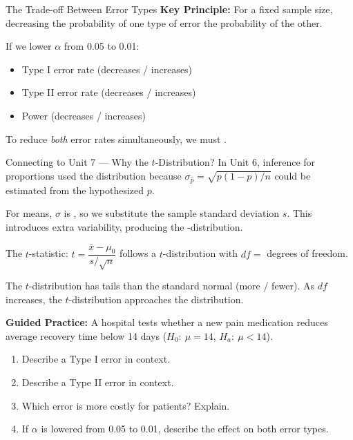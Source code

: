 \documentclass[10pt]{article}
\begin{document}
\begin{notesbox}{The Trade-off Between Error Types}
\textbf{Key Principle:} For a fixed sample size, decreasing the probability of one type
of error \blank{4cm} the probability of the other.

\vspace{0.1in}
If we lower $\alpha$ from 0.05 to 0.01:
\begin{itemize}
    \item Type I error rate \blank{2cm} (decreases / increases)
    \item Type II error rate \blank{2cm} (decreases / increases)
    \item Power \blank{2cm} (decreases / increases)
\end{itemize}

\vspace{0.1in}
To reduce \emph{both} error rates simultaneously, we must \blank{5cm}.
\end{notesbox}

\begin{notesbox}{Connecting to Unit 7 --- Why the $t$-Distribution?}
In Unit 6, inference for proportions used the \blank{2cm} distribution because
$\sigma_{\hat p} = \sqrt{p(1-p)/n}$ could be estimated from the hypothesized $p$.

For means, $\sigma$ is \blank{4cm}, so we substitute the sample standard deviation
$s$. This introduces extra variability, producing the \blank{3cm}-distribution.

\vspace{0.1in}
The $t$-statistic: \quad $t = \dfrac{\bar x - \mu_0}{s/\sqrt{n}}$ \quad follows a
$t$-distribution with $df = $ \blank{2cm} degrees of freedom.

\vspace{0.1in}
The $t$-distribution has \blank{4cm} tails than the standard normal (more / fewer).
As $df$ increases, the $t$-distribution approaches the \blank{3cm} distribution.
\end{notesbox}

\begin{practicebox}
\textbf{Guided Practice:} A hospital tests whether a new pain medication reduces
average recovery time below 14 days ($H_0{:}\ \mu = 14$, $H_a{:}\ \mu < 14$).

\begin{enumerate}
  \item Describe a Type I error in context.

  \item Describe a Type II error in context.

  \item Which error is more costly for patients? Explain.

  \item If $\alpha$ is lowered from 0.05 to 0.01, describe the effect on both
        error types.
\end{enumerate}
\end{practicebox}
\end{document}
